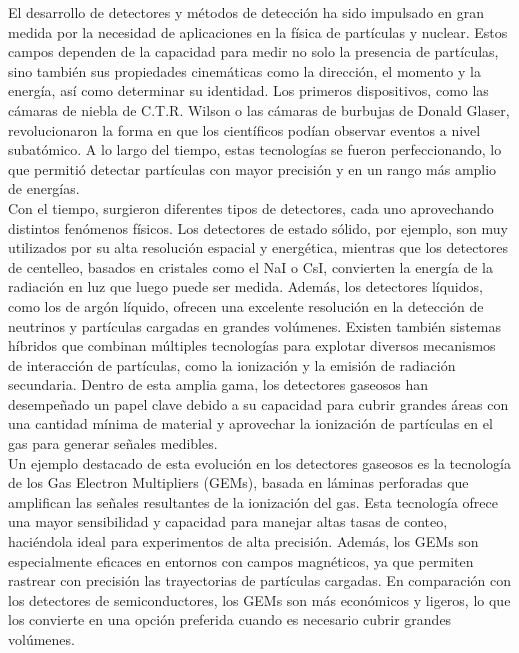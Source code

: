 \documentclass{article}
\begin{document}
\noindent El desarrollo de detectores y métodos de detección ha sido impulsado en gran medida por la necesidad de aplicaciones en la física de partículas y nuclear. Estos campos dependen de la capacidad para medir no solo la presencia de partículas, sino también sus propiedades cinemáticas como la dirección, el momento y la energía, así como determinar su identidad. Los primeros dispositivos, como las cámaras de niebla de C.T.R. Wilson o las cámaras de burbujas de Donald Glaser, revolucionaron la forma en que los científicos podían observar eventos a nivel subatómico. A lo largo del tiempo, estas tecnologías se fueron perfeccionando, lo que permitió detectar partículas con mayor precisión y en un rango más amplio de energías.\\

\noindent Con el tiempo, surgieron diferentes tipos de detectores, cada uno aprovechando distintos fenómenos físicos. Los detectores de estado sólido, por ejemplo, son muy utilizados por su alta resolución espacial y energética, mientras que los detectores de centelleo, basados en cristales como el NaI o CsI, convierten la energía de la radiación en luz que luego puede ser medida. Además, los detectores líquidos, como los de argón líquido, ofrecen una excelente resolución en la detección de neutrinos y partículas cargadas en grandes volúmenes. Existen también sistemas híbridos que combinan múltiples tecnologías para explotar diversos mecanismos de interacción de partículas, como la ionización y la emisión de radiación secundaria. Dentro de esta amplia gama, los detectores gaseosos han desempeñado un papel clave debido a su capacidad para cubrir grandes áreas con una cantidad mínima de material y aprovechar la ionización de partículas en el gas para generar señales medibles. \\

\noindent Un ejemplo destacado de esta evolución en los detectores gaseosos es la tecnología de los Gas Electron Multipliers (GEMs), basada en láminas perforadas que amplifican las señales resultantes de la ionización del gas. Esta tecnología ofrece una mayor sensibilidad y capacidad para manejar altas tasas de conteo, haciéndola ideal para experimentos de alta precisión. Además, los GEMs son especialmente eficaces en entornos con campos magnéticos, ya que permiten rastrear con precisión las trayectorias de partículas cargadas. En comparación con los detectores de semiconductores, los GEMs son más económicos y ligeros, lo que los convierte en una opción preferida cuando es necesario cubrir grandes volúmenes.\\
\end{document}
